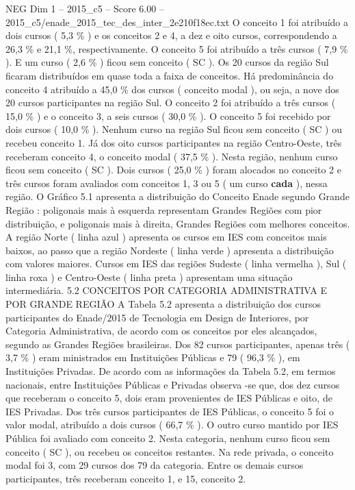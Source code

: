 \begin{textsample}{NEG Dim 1 – 2015\_c5 – Score 6.00 – 2015\_c5/enade\_2015\_tec\_des\_inter\_2e210f18ec.txt}
O conceito 1 foi atribuído a dois cursos ( 5,3 \% ) e os conceitos 2 e 4, a dez e oito cursos, correspondendo a 26,3 \% e 21,1 \%, respectivamente.
O conceito 5 foi atribuído a três cursos ( 7,9 \% ).
E um curso ( 2,6 \% ) ficou sem conceito ( SC ).
Os 20 cursos da região Sul ficaram distribuídos em quase toda a faixa de conceitos.
Há predominância do conceito 4 atribuído a 45,0 \% dos cursos ( conceito modal ), ou seja, a nove dos 20 cursos participantes na região Sul.
O conceito 2 foi atribuído a três cursos ( 15,0 \% ) e o conceito 3, a seis cursos ( 30,0 \% ).
O conceito 5 foi recebido por dois cursos ( 10,0 \% ).
Nenhum curso na região Sul ficou sem conceito ( SC ) ou recebeu conceito 1.
Já dos oito cursos participantes na região Centro-Oeste, três receberam conceito 4, o conceito modal ( 37,5 \% ).
Nesta região, nenhum curso ficou sem conceito ( SC ).
Dois cursos ( 25,0 \% ) foram alocados no conceito 2 e três cursos foram avaliados com conceitos 1, 3 ou 5 ( um curso \textbf{cada} ), nessa região.
O Gráfico 5.1 apresenta a distribuição do Conceito Enade segundo Grande Região : poligonais mais à esquerda representam Grandes Regiões com pior distribuição, e poligonais mais à direita, Grandes Regiões com melhores conceitos.
A região Norte ( linha azul ) apresenta os cursos em IES com conceitos mais baixos, ao passo que a região Nordeste ( linha verde ) apresenta a distribuição com valores maiores.
Cursos em IES das regiões Sudeste ( linha vermelha ), Sul ( linha roxa ) e Centro-Oeste ( linha preta ) apresentam uma situação intermediária. 5.2 CONCEITOS POR CATEGORIA ADMINISTRATIVA E POR GRANDE REGIÃO A Tabela 5.2 apresenta a distribuição dos cursos participantes do Enade/2015 de Tecnologia em Design de Interiores, por Categoria Administrativa, de acordo com os conceitos por eles alcançados, segundo as Grandes Regiões brasileiras.
Dos 82 cursos participantes, apenas três ( 3,7 \% ) eram ministrados em Instituições Públicas e 79 ( 96,3 \% ), em Instituições Privadas.
De acordo com as informações da Tabela 5.2, em termos nacionais, entre Instituições Públicas e Privadas observa -se que, dos dez cursos que receberam o conceito 5, dois eram provenientes de IES Públicas e oito, de IES Privadas.
Dos três cursos participantes de IES Públicas, o conceito 5 foi o valor modal, atribuído a dois cursos ( 66,7 \% ).
O outro curso mantido por IES Pública foi avaliado com conceito 2.
Nesta categoria, nenhum curso ficou sem conceito ( SC ), ou recebeu os conceitos restantes.
Na rede privada, o conceito modal foi 3, com 29 cursos dos 79 da categoria.
Entre os demais cursos participantes, três receberam conceito 1, e 15, conceito 2.

\end{textsample}
